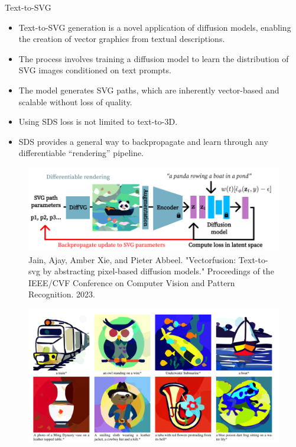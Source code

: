 \begin{frame}[allowframebreaks]{Text-to-SVG}
    \begin{itemize}
        \item Text-to-SVG generation is a novel application of diffusion models, enabling the creation of vector graphics from textual descriptions.
        \item The process involves training a diffusion model to learn the distribution of SVG images conditioned on text prompts.
        \item The model generates SVG paths, which are inherently vector-based and scalable without loss of quality.
    \end{itemize}
    \framebreak
    
    \begin{itemize}
        \item Using SDS loss is not limited to text-to-3D.
        \item SDS provides a general way to backpropagate and learn through any differentiable “rendering” pipeline.
    \end{itemize}
    \begin{figure}
        \centering
        \includegraphics[width=1.05\linewidth,height=\textheight,keepaspectratio]{images/adv-img-gen/slide_160_1_img.png}
        \caption*{Jain, Ajay, Amber Xie, and Pieter Abbeel. "Vectorfusion: Text-to-svg by abstracting pixel-based diffusion models." Proceedings of the IEEE/CVF Conference on Computer Vision and Pattern Recognition. 2023.}
    \end{figure}

    \framebreak
    \begin{figure}
        \centering
        \includegraphics[width=1.05\linewidth,height=\textheight,keepaspectratio]{images/adv-img-gen/slide_161_1_img.png}
    \end{figure}
\end{frame}